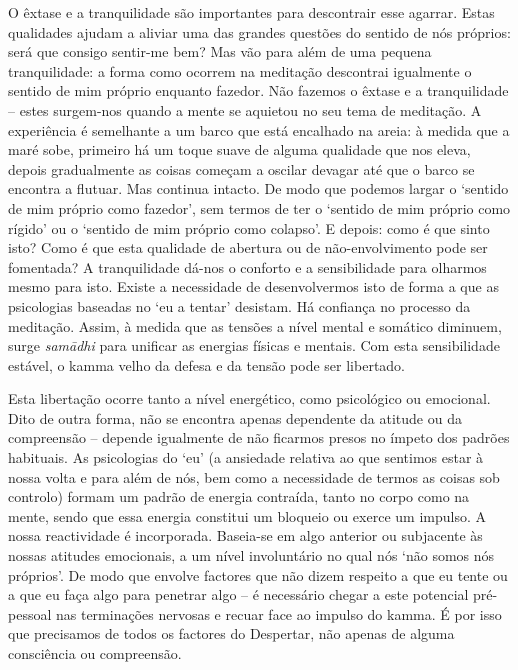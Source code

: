 O êxtase e a tranquilidade são importantes para descontrair esse agarrar. Estas qualidades ajudam a aliviar uma das grandes questões do sentido de nós próprios: será que consigo sentir-me bem? Mas vão para além de uma pequena tranquilidade: a forma como ocorrem na meditação descontrai igualmente o sentido de mim próprio enquanto fazedor. Não fazemos o êxtase e a tranquilidade -- estes surgem-nos quando a mente se aquietou no seu tema de meditação. A experiência é semelhante a um barco que está encalhado na areia: à medida que a maré sobe, primeiro há um toque suave de alguma qualidade que nos eleva, depois gradualmente as coisas começam a oscilar devagar até que o barco se encontra a flutuar. Mas continua intacto. De modo que podemos largar o `sentido de mim próprio como fazedor', sem termos de ter o `sentido de mim próprio como rígido' ou o `sentido de mim próprio como colapso'. E depois: como é que sinto isto? Como é que esta qualidade de abertura ou de não-envolvimento pode ser fomentada? A tranquilidade dá-nos o conforto e a sensibilidade para olharmos mesmo para isto. Existe a necessidade de desenvolvermos isto de forma a que as psicologias baseadas no `eu a tentar' desistam. Há confiança no processo da meditação. Assim, à medida que as tensões a nível mental e somático diminuem, surge \emph{samādhi} para unificar as energias físicas e mentais. Com esta sensibilidade estável, o kamma velho da defesa e da tensão pode ser libertado.

Esta libertação ocorre tanto a nível energético, como psicológico ou emocional. Dito de outra forma, não se encontra apenas dependente da atitude ou da compreensão -- depende igualmente de não ficarmos presos no ímpeto dos padrões habituais. As psicologias do `eu' (a ansiedade relativa ao que sentimos estar à nossa volta e para além de nós, bem como a necessidade de termos as coisas sob controlo) formam um padrão de energia contraída, tanto no corpo como na mente, sendo que essa energia constitui um bloqueio ou exerce um impulso. A nossa reactividade é incorporada. Baseia-se em algo anterior ou subjacente às nossas atitudes emocionais, a um nível involuntário no qual nós `não somos nós próprios'. De modo que envolve factores que não dizem respeito a que eu tente ou a que eu faça algo para penetrar algo -- é necessário chegar a este potencial pré-pessoal nas terminações nervosas e recuar face ao impulso do kamma. É por isso que precisamos de todos os factores do Despertar, não apenas de alguma consciência ou compreensão.


